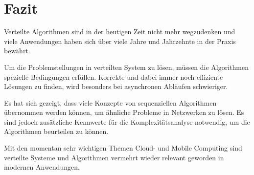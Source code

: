 \chapter{Fazit}
\label{chap:schlussfolgerungen}

Verteilte Algorithmen sind in der heutigen Zeit nicht mehr wegzudenken und viele Anwendungen haben sich über viele Jahre und  Jahrzehnte in der Praxis bewährt.

Um die Problemstellungen in verteilten System zu lösen, müssen die Algorithmen spezielle Bedingungen erfüllen. Korrekte und dabei immer noch effiziente Lösungen zu finden, wird besonders bei asynchronen Abläufen schwieriger. 

Es hat sich gezeigt, dass viele Konzepte von sequenziellen Algorithmen übernommen werden können, um ähnliche Probleme in Netzwerken zu lösen. Es sind jedoch zusätzliche Kennwerte für die Komplexitätsanalyse notwendig, um die Algorithmen beurteilen zu können. 

Mit den momentan sehr wichtigen Themen Cloud- und Mobile Computing sind verteilte Systeme und Algorithmen vermehrt wieder relevant geworden in modernen Anwendungen.